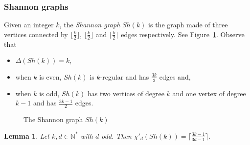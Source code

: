 \documentclass[11pt]{article}
\newcommand{\vertex}{\node[vertex]}
\newtheorem{lemma}{Lemma}[section]
\begin{document}
\subsubsection*{Shannon graphs}

Given an integer $k$, the \emph{Shannon graph} $Sh(k)$ is the graph made of three vertices connected by $\lfloor \frac{k}{2} \rfloor$, $\lfloor \frac{k}{2} \rfloor$ and $\lceil \frac{k}{2} \rceil$ edges respectively. See Figure~\ref{fig:shanon}. Observe that 
\begin{itemize}
    \item $\Delta(Sh(k))=k$,
    \item  when $k$ is even, $Sh(k)$ is $k$-regular and has $\frac{3k}{2}$ edges and,
    \item when $k$ is odd, $Sh(k)$ has two vertices of degree $k$ and one vertex of degree $k-1$ and has $\frac{3k-1}{2}$ edges. 
\end{itemize}

    \begin{figure}[H]
    \centering
    \caption{The Shannon graph $Sh(k)$} \label{fig:shanon}
    \end{figure}


\begin{lemma}\label{lem:shannon_tight}
Let $k,d \in \mathbb N^*$ with $d$ odd. Then $\chi'_d(Sh(k)) = \lceil\frac{3k-1}{3d-1}\rceil$. 
\end{lemma}
\end{document}
